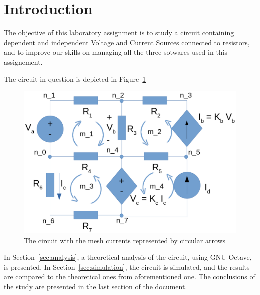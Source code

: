 \section{Introduction}
\label{sec:introduction}



The objective of this laboratory assignment is to study a circuit containing dependent and independent Voltage and Current Sources connected to resistors, and to improve our skills on managing all the three sotwares used in this assignement.

The circuit in question is depicted in Figure~\ref{fig:circuit}
\begin{figure}
  \includegraphics[width=\linewidth]{circuit.png}
  \caption{The circuit with the mesh currents represented by circular arrows}
  \label{fig:circuit}
\end{figure}

In Section~\ref{sec:analysis}, a theoretical analysis of the circuit, using GNU Octave,  is presented. In Section~\ref{sec:simulation}, the circuit is simulated, and the results are compared to the theoretical ones from
aforementioned one. The conclusions of the study are presented in the last section of the document.
